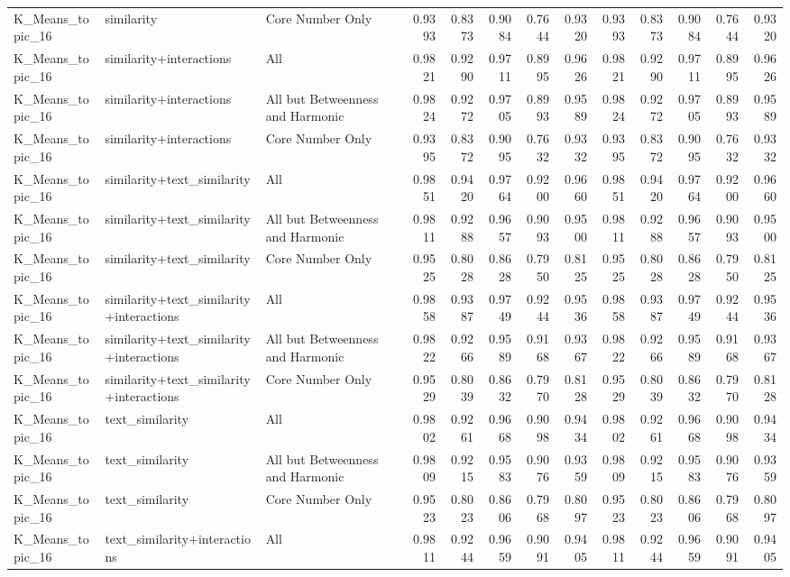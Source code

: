 \begin{tabular}{lllrrrrrrrrrr}
K_Means_topic_16 & similarity & Core Number Only & 0.9393 & 0.8373 & 0.9084 & 0.7644 & 0.9320 & 0.9393 & 0.8373 & 0.9084 & 0.7644 & 0.9320 \\
K_Means_topic_16 & similarity+interactions & All & 0.9821 & 0.9290 & 0.9711 & 0.8995 & 0.9626 & 0.9821 & 0.9290 & 0.9711 & 0.8995 & 0.9626 \\
K_Means_topic_16 & similarity+interactions & All but Betweenness and Harmonic & 0.9824 & 0.9272 & 0.9705 & 0.8993 & 0.9589 & 0.9824 & 0.9272 & 0.9705 & 0.8993 & 0.9589 \\
K_Means_topic_16 & similarity+interactions & Core Number Only & 0.9395 & 0.8372 & 0.9095 & 0.7632 & 0.9332 & 0.9395 & 0.8372 & 0.9095 & 0.7632 & 0.9332 \\
K_Means_topic_16 & similarity+text_similarity & All & 0.9851 & 0.9420 & 0.9764 & 0.9200 & 0.9660 & 0.9851 & 0.9420 & 0.9764 & 0.9200 & 0.9660 \\
K_Means_topic_16 & similarity+text_similarity & All but Betweenness and Harmonic & 0.9811 & 0.9288 & 0.9657 & 0.9093 & 0.9500 & 0.9811 & 0.9288 & 0.9657 & 0.9093 & 0.9500 \\
K_Means_topic_16 & similarity+text_similarity & Core Number Only & 0.9525 & 0.8028 & 0.8628 & 0.7950 & 0.8125 & 0.9525 & 0.8028 & 0.8628 & 0.7950 & 0.8125 \\
K_Means_topic_16 & similarity+text_similarity+interactions & All & 0.9858 & 0.9387 & 0.9749 & 0.9244 & 0.9536 & 0.9858 & 0.9387 & 0.9749 & 0.9244 & 0.9536 \\
K_Means_topic_16 & similarity+text_similarity+interactions & All but Betweenness and Harmonic & 0.9822 & 0.9266 & 0.9589 & 0.9168 & 0.9367 & 0.9822 & 0.9266 & 0.9589 & 0.9168 & 0.9367 \\
K_Means_topic_16 & similarity+text_similarity+interactions & Core Number Only & 0.9529 & 0.8039 & 0.8632 & 0.7970 & 0.8128 & 0.9529 & 0.8039 & 0.8632 & 0.7970 & 0.8128 \\
K_Means_topic_16 & text_similarity & All & 0.9802 & 0.9261 & 0.9668 & 0.9098 & 0.9434 & 0.9802 & 0.9261 & 0.9668 & 0.9098 & 0.9434 \\
K_Means_topic_16 & text_similarity & All but Betweenness and Harmonic & 0.9809 & 0.9215 & 0.9583 & 0.9076 & 0.9359 & 0.9809 & 0.9215 & 0.9583 & 0.9076 & 0.9359 \\
K_Means_topic_16 & text_similarity & Core Number Only & 0.9523 & 0.8023 & 0.8606 & 0.7968 & 0.8097 & 0.9523 & 0.8023 & 0.8606 & 0.7968 & 0.8097 \\
K_Means_topic_16 & text_similarity+interactions & All & 0.9811 & 0.9244 & 0.9659 & 0.9091 & 0.9405 & 0.9811 & 0.9244 & 0.9659 & 0.9091 & 0.9405 \\

\end{tabular}
